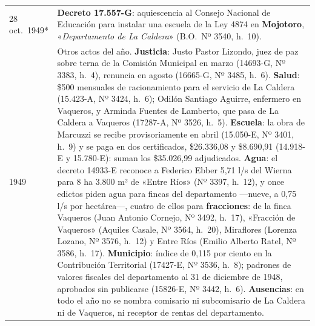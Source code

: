 \begin{longtable}{@{}p{2.7cm}p{10.3cm}@{}}
28 oct.\ 1949* & \textbf{Decreto 17.557-G}: aquiescencia al Consejo Nacional de Educación para instalar una escuela de la Ley 4874 en \textbf{Mojotoro}, «\textit{Departamento de La Caldera}» (B.O.\ Nº 3540, h.\ 10). \\
1949 & Otros actos del año. \textbf{Justicia}: Justo Pastor Lizondo, juez de paz sobre terna de la Comisión Municipal en marzo (14693-G, Nº 3383, h.\ 4), renuncia en agosto (16665-G, Nº 3485, h.\ 6). \textbf{Salud}: \$500 mensuales de racionamiento para el servicio de La Caldera (15.423-A, Nº 3424, h.\ 6); Odilón Santiago Aguirre, enfermero en Vaqueros, y Arminda Fuentes de Lamberto, que pasa de La Caldera a Vaqueros (17287-A, Nº 3526, h.\ 5). \textbf{Escuela}: la obra de Marcuzzi se recibe provisoriamente en abril (15.050-E, Nº 3401, h.\ 9) y se paga en dos certificados, \$26.336,08 y \$8.690,91 (14.918-E y 15.780-E): suman los \$35.026,99 adjudicados. \textbf{Agua}: el decreto 14933-E reconoce a Federico Ebber 5,71 l/s del Wierna para 8 ha 3.800 m² de «Entre Ríos» (Nº 3397, h.\ 12), y once edictos piden agua para fincas del departamento ---nueve, a 0,75 l/s por hectárea---, cuatro de ellos para \textbf{fracciones}: de la finca Vaqueros (Juan Antonio Cornejo, Nº 3492, h.\ 17), «Fracción de Vaqueros» (Aquiles Casale, Nº 3564, h.\ 20), Miraflores (Lorenza Lozano, Nº 3576, h.\ 12) y Entre Ríos (Emilio Alberto Ratel, Nº 3586, h.\ 17). \textbf{Municipio}: índice de 0,115 por ciento en la Contribución Territorial (17427-E, Nº 3536, h.\ 8); padrones de valores fiscales del departamento al 31 de diciembre de 1948, aprobados sin publicarse (15826-E, Nº 3442, h.\ 6). \textbf{Ausencias}: en todo el año no se nombra comisario ni subcomisario de La Caldera ni de Vaqueros, ni receptor de rentas del departamento. \\

\end{longtable}
